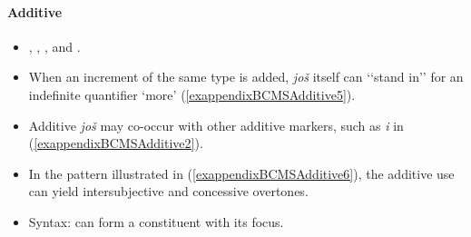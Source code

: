 \paragraph{Additive}\label{appendixBCMSAdditive}
\begin{itemize}
	\sloppy
	\item \textcite{Buchholz1991}, \textcite[755]{KontrastiveGrammatik}, \textcite{Prajnkovic2018}, \textcite{Tekavcic1989} and \textcite[s.v. \textit{još}]{HJP}.
	\item When an increment of the same type is added, \textit{još} itself can \lq\lq stand in\rq\rq{ }for an indefinite quantifier \lq more\rq{ }(\ref{exappendixBCMSAdditive5}).
	\item Additive \textit{još} may co-occur with other additive markers, such as \textit{i} in (\ref{exappendixBCMSAdditive2}).
	\item In the pattern illustrated in (\ref{exappendixBCMSAdditive6}), the additive use can yield intersubjective and concessive overtones.
	\item Syntax: can form a constituent with its focus.
\end{itemize}
